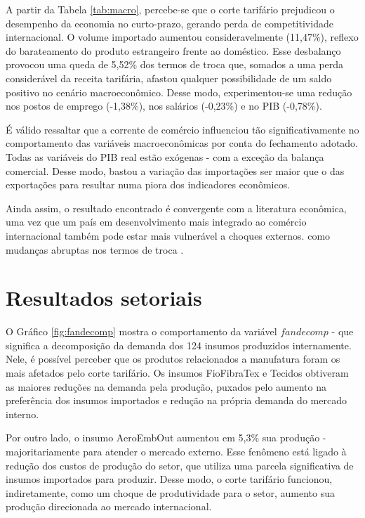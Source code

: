 A partir da Tabela \ref{tab:macro}, percebe-se que o corte tarifário prejudicou o desempenho da economia no curto-prazo, gerando perda de competitividade internacional. O volume importado aumentou consideravelmente (11,47\%), reflexo do barateamento do produto estrangeiro frente ao doméstico. Esse desbalanço provocou uma queda de 5,52\% dos termos de troca que, somados a uma perda considerável da receita tarifária, afastou qualquer possibilidade de um saldo positivo no cenário macroeconômico. Desse modo, experimentou-se uma redução nos postos de emprego (-1,38\%), nos salários (-0,23\%) e no PIB (-0,78\%).
 
É válido ressaltar que a corrente de comércio influenciou tão significativamente no comportamento das variáveis macroeconômicas por conta do fechamento adotado. Todas as variáveis do PIB real estão exógenas - com a exceção da balança comercial. Desse modo, bastou a variação das importações ser maior que o das exportações para resultar numa piora dos indicadores econômicos.

Ainda assim, o resultado encontrado é convergente com a literatura econômica, uma vez que um país em desenvolvimento mais integrado ao comércio internacional também pode estar mais vulnerável a choques externos. como mudanças abruptas nos termos de troca \cite{bannisterthugge01, winters02}.


\section{Resultados setoriais} \label{sec:resultados_setoriais}

O Gráfico \ref{fig:fandecomp} mostra o comportamento da variável $fandecomp$ - que significa a decomposição da demanda dos 124 insumos produzidos internamente. Nele, é possível perceber que os produtos relacionados a manufatura foram os mais afetados pelo corte tarifário. Os insumos FioFibraTex e Tecidos obtiveram as maiores reduções na demanda pela produção, puxados pelo aumento na preferência dos insumos importados e redução na própria demanda do mercado interno.

Por outro lado, o insumo AeroEmbOut aumentou em 5,3\% sua produção - majoritariamente para atender o mercado externo. Esse fenômeno está ligado à redução dos custos de produção do setor, que utiliza uma parcela significativa de insumos importados para produzir. Desse modo, o corte tarifário funcionou, indiretamente, como um choque de produtividade para o setor, aumento sua produção direcionada ao mercado internacional.

